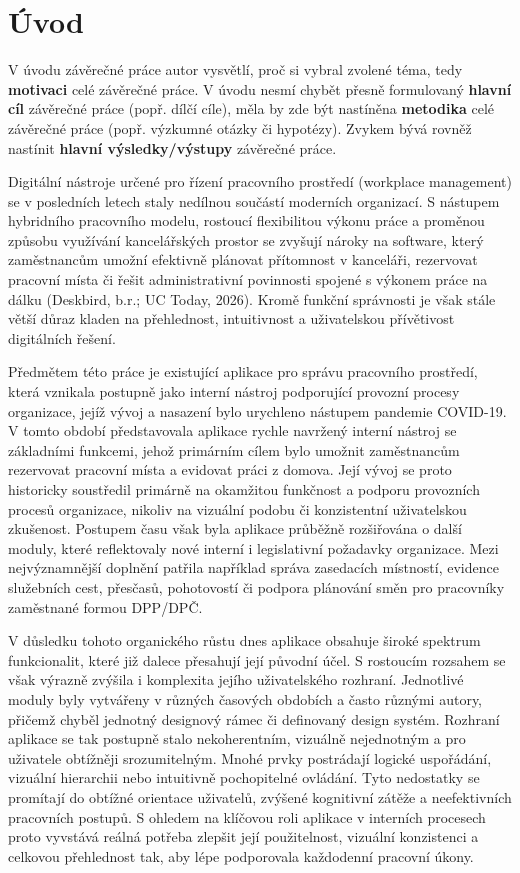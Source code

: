 \chapter*{Úvod}

V úvodu závěrečné práce autor vysvětlí, proč si vybral zvolené téma, tedy \textbf{motivaci} celé závěrečné práce. V úvodu nesmí chybět přesně formulovaný \textbf{hlavní cíl} závěrečné práce (popř. dílčí cíle), měla by zde být nastíněna \textbf{metodika} celé závěrečné práce (popř. výzkumné otázky či hypotézy). Zvykem bývá rovněž nastínit \textbf{hlavní výsledky/výstupy} závěrečné práce. 


Digitální nástroje určené pro řízení pracovního prostředí (workplace management) se v posledních letech staly nedílnou součástí moderních organizací. S nástupem hybridního pracovního modelu, rostoucí flexibilitou výkonu práce a proměnou způsobu využívání kancelářských prostor se zvyšují nároky na software, který zaměstnancům umožní efektivně plánovat přítomnost v kanceláři, rezervovat pracovní místa či řešit administrativní povinnosti spojené s výkonem práce na dálku (Deskbird, b.r.; UC Today, 2026). Kromě funkční správnosti je však stále větší důraz kladen na přehlednost, intuitivnost a uživatelskou přívětivost digitálních řešení.

Předmětem této práce je existující aplikace pro správu pracovního prostředí, která vznikala postupně jako interní nástroj podporující provozní procesy organizace, jejíž vývoj a nasazení bylo urychleno nástupem pandemie COVID-19. V tomto období představovala aplikace rychle navržený interní nástroj se základními funkcemi, jehož primárním cílem bylo umožnit zaměstnancům rezervovat pracovní místa a evidovat práci z domova. Její vývoj se proto historicky soustředil primárně na okamžitou funkčnost a podporu provozních procesů organizace, nikoliv na vizuální podobu či konzistentní uživatelskou zkušenost. Postupem času však byla aplikace průběžně rozšiřována o další moduly, které reflektovaly nové interní i legislativní požadavky organizace. Mezi nejvýznamnější doplnění patřila například správa zasedacích místností, evidence služebních cest, přesčasů, pohotovostí či podpora plánování směn pro pracovníky zaměstnané formou DPP/DPČ.

V důsledku tohoto organického růstu dnes aplikace obsahuje široké spektrum funkcionalit, které již dalece přesahují její původní účel. S rostoucím rozsahem se však výrazně zvýšila i komplexita jejího uživatelského rozhraní. Jednotlivé moduly byly vytvářeny v různých časových obdobích a často různými autory, přičemž chyběl jednotný designový rámec či definovaný design systém. Rozhraní aplikace se tak postupně stalo nekoherentním, vizuálně nejednotným a pro uživatele obtížněji srozumitelným. Mnohé prvky postrádají logické uspořádání, vizuální hierarchii nebo intuitivně pochopitelné ovládání. Tyto nedostatky se promítají do obtížné orientace uživatelů, zvýšené kognitivní zátěže a neefektivních pracovních postupů. S ohledem na klíčovou roli aplikace v interních procesech proto vyvstává reálná potřeba zlepšit její použitelnost, vizuální konzistenci a celkovou přehlednost tak, aby lépe podporovala každodenní pracovní úkony.

